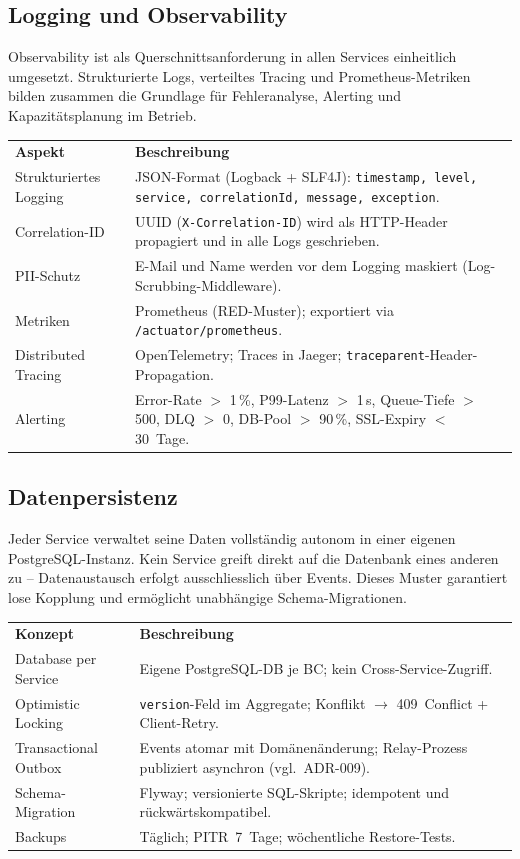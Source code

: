 \subsection{Logging und Observability}

Observability ist als Querschnittsanforderung in allen Services einheitlich
umgesetzt. Strukturierte Logs, verteiltes Tracing und Prometheus-Metriken bilden
zusammen die Grundlage für Fehleranalyse, Alerting und Kapazitätsplanung im Betrieb.

\begin{tabularx}{\textwidth}{L{3cm} X}
  \color{white}\textbf{Aspekt} & \color{white}\textbf{Beschreibung} \\
  Strukturiertes Logging & JSON-Format (Logback + SLF4J): \texttt{timestamp, level, service, correlationId, message, exception}. \\
  Correlation-ID & UUID (\texttt{X-Correlation-ID}) wird als HTTP-Header propagiert und in alle Logs geschrieben. \\
  PII-Schutz & E-Mail und Name werden vor dem Logging maskiert (Log-Scrubbing-Middleware). \\
  Metriken & Prometheus (RED-Muster); exportiert via \texttt{/actuator/prometheus}. \\
  Distributed Tracing & OpenTelemetry; Traces in Jaeger; \texttt{traceparent}-Header-Propagation. \\
  Alerting & Error-Rate $>$ 1\,\%, P99-Latenz $>$ 1\,s, Queue-Tiefe $>$ 500, DLQ $>$ 0, DB-Pool $>$ 90\,\%, SSL-Expiry $<$ 30~Tage. \\
\end{tabularx}

\subsection{Datenpersistenz}

Jeder Service verwaltet seine Daten vollständig autonom in einer eigenen
PostgreSQL-Instanz. Kein Service greift direkt auf die Datenbank eines anderen
zu -- Datenaustausch erfolgt ausschliesslich über Events. Dieses Muster
garantiert lose Kopplung und ermöglicht unabhängige Schema-Migrationen.

\begin{tabularx}{\textwidth}{L{3.5cm} X}
  \color{white}\textbf{Konzept} & \color{white}\textbf{Beschreibung} \\
  Database per Service & Eigene PostgreSQL-DB je BC; kein Cross-Service-Zugriff. \\
  Optimistic Locking & \texttt{version}-Feld im Aggregate; Konflikt $\to$ 409~Conflict + Client-Retry. \\
  Transactional Outbox & Events atomar mit Domänenänderung; Relay-Prozess publiziert asynchron (vgl.\ ADR-009). \\
  Schema-Migration & Flyway; versionierte SQL-Skripte; idempotent und rückwärtskompatibel. \\
  Backups & Täglich; PITR~7~Tage; wöchentliche Restore-Tests. \\
\end{tabularx}

